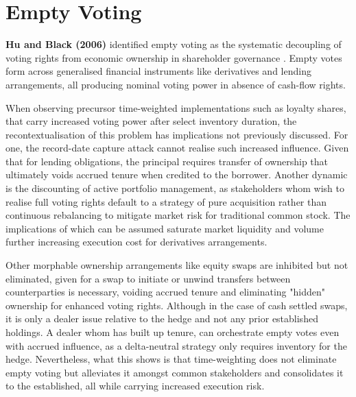 \documentclass[a4paper,12pt]{article}
\begin{document}
\newpage

\section{\signifier Empty Voting}

\textbf{Hu and Black (2006)} identified empty voting as the systematic decoupling of voting rights from economic ownership in shareholder governance \cite{hu2006}. Empty votes form across generalised financial instruments like derivatives and lending arrangements, all producing nominal voting power in absence of cash-flow rights.

When observing precursor time-weighted implementations such as loyalty shares, that carry increased voting power after select inventory duration, the recontextualisation of this problem has implications not previously discussed. For one, the record-date capture attack cannot realise such increased influence. Given that for lending obligations, the principal requires transfer of ownership that ultimately voids accrued tenure when credited to the borrower. Another dynamic is the discounting of active portfolio management, as stakeholders whom wish to realise full voting rights default to a strategy of pure acquisition rather than continuous rebalancing to mitigate market risk for traditional common stock. The implications of which can be assumed saturate market liquidity and volume further increasing execution cost for derivatives arrangements. 

Other morphable ownership arrangements like equity swaps are inhibited but not eliminated, given for a swap to initiate or unwind transfers between counterparties is necessary, voiding accrued tenure and eliminating "hidden" ownership for enhanced voting rights. Although in the case of cash settled swaps, it is only a dealer issue relative to the hedge and not any prior established holdings. A dealer whom has built up tenure, can orchestrate empty votes even with accrued influence, as a delta-neutral strategy only requires inventory for the hedge. Nevertheless, what this shows is that time-weighting does not eliminate empty voting but alleviates it amongst common stakeholders and consolidates it to the established, all while carrying increased execution risk.
\end{document}
